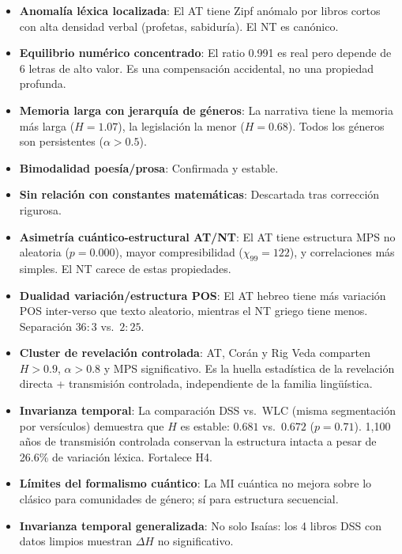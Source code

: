 \documentclass[12pt,a4paper]{article}
\begin{document}
\begin{itemize}[leftmargin=2em]
\item \textbf{Anomal\'ia l\'exica localizada}: El AT tiene Zipf an\'omalo por libros
      cortos con alta densidad verbal (profetas, sabidur\'ia). El NT es can\'onico.
\item \textbf{Equilibrio num\'erico concentrado}: El ratio 0.991 es real pero depende
      de 6 letras de alto valor. Es una compensaci\'on accidental, no una propiedad
      profunda.
\item \textbf{Memoria larga con jerarqu\'ia de g\'eneros}: La narrativa tiene la
      memoria m\'as larga ($H = 1.07$), la legislaci\'on la menor ($H = 0.68$).
      Todos los g\'eneros son persistentes ($\alpha > 0.5$).
\item \textbf{Bimodalidad poes\'ia/prosa}: Confirmada y estable.
\item \textbf{Sin relaci\'on con constantes matem\'aticas}: Descartada tras
      correcci\'on rigurosa.
\item \textbf{Asimetr\'ia cu\'antico-estructural AT/NT}: El AT tiene estructura MPS
      no aleatoria ($p = 0.000$), mayor compresibilidad ($\chi_{99} = 122$), y
      correlaciones m\'as simples. El NT carece de estas propiedades.
\item \textbf{Dualidad variaci\'on/estructura POS}: El AT hebreo tiene m\'as variaci\'on
      POS inter-verso que texto aleatorio, mientras el NT griego tiene menos.
      Separaci\'on $36{:}3$ vs.\ $2{:}25$.
\item \textbf{Cluster de revelaci\'on controlada}: AT, Cor\'an y Rig Veda comparten
      $H > 0.9$, $\alpha > 0.8$ y MPS significativo. Es la huella estad\'istica
      de la revelaci\'on directa + transmisi\'on controlada, independiente de la
      familia ling\"u\'istica.
\item \textbf{Invarianza temporal}: La comparaci\'on DSS vs.\ WLC (misma
      segmentaci\'on por vers\'iculos) demuestra que $H$ es estable:
      $0.681$ vs.\ $0.672$ ($p = 0.71$). 1,100 a\~nos de transmisi\'on
      controlada conservan la estructura intacta a pesar de 26.6\%
      de variaci\'on l\'exica. Fortalece H4.
\item \textbf{L\'imites del formalismo cu\'antico}: La MI cu\'antica no mejora sobre
      lo cl\'asico para comunidades de g\'enero; s\'i para estructura secuencial.
\item \textbf{Invarianza temporal generalizada}: No solo Isa\'ias: los 4 libros
      DSS con datos limpios muestran $\Delta H$ no significativo.

\end{itemize}
\end{document}
